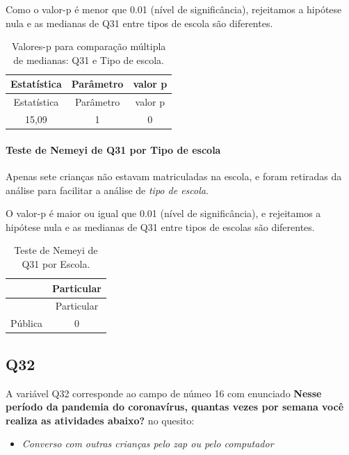 \documentclass[]{article}
\providecommand{\tightlist}{%
  \setlength{\itemsep}{0pt}\setlength{\parskip}{0pt}}
\let\oldparagraph\paragraph
\renewcommand{\paragraph}[1]{\oldparagraph{#1}\mbox{}}
\begin{document}
Como o valor-p é menor que 0.01 (nível de significância), rejeitamos a hipótese nula e as medianas de Q31 entre tipos de escola são diferentes.

\begin{longtable}[]{@{}ccc@{}}
\caption{\label{tab:unnamed-chunk-1063}Valores-p para comparação múltipla de medianas: Q31 e Tipo de escola.}\tabularnewline
\toprule
Estatística & Parâmetro & valor p\tabularnewline
\midrule
\endfirsthead
\toprule
Estatística & Parâmetro & valor p\tabularnewline
\midrule
\endhead
15,09 & 1 & 0\tabularnewline
\bottomrule
\end{longtable}

\hypertarget{teste-de-nemeyi-de-q31-por-tipo-de-escola}{%
\paragraph{Teste de Nemeyi de Q31 por Tipo de escola}\label{teste-de-nemeyi-de-q31-por-tipo-de-escola}}

Apenas sete crianças não estavam matriculadas na escola, e foram retiradas da análise para facilitar a análise de \emph{tipo de escola}.

O valor-p é maior ou igual que 0.01 (nível de significância), e rejeitamos a hipótese nula e as medianas de Q31 entre tipos de escolas são diferentes.

\begin{longtable}[]{@{}lc@{}}
\caption{\label{tab:unnamed-chunk-1065}Teste de Nemeyi de Q31 por Escola.}\tabularnewline
\toprule
& Particular\tabularnewline
\midrule
\endfirsthead
\toprule
& Particular\tabularnewline
\midrule
\endhead
Pública & 0\tabularnewline
\bottomrule
\end{longtable}

\cleardoublepage

\hypertarget{q32}{%
\subsection{Q32}\label{q32}}

A variável Q32 corresponde ao campo de númeo 16 com enunciado \textbf{Nesse período da pandemia do coronavírus, quantas vezes por semana você realiza as atividades abaixo?} no quesito:

\begin{itemize}
\tightlist
\item
  \emph{Converso com outras crianças pelo zap ou pelo computador}
\end{itemize}
\end{document}
